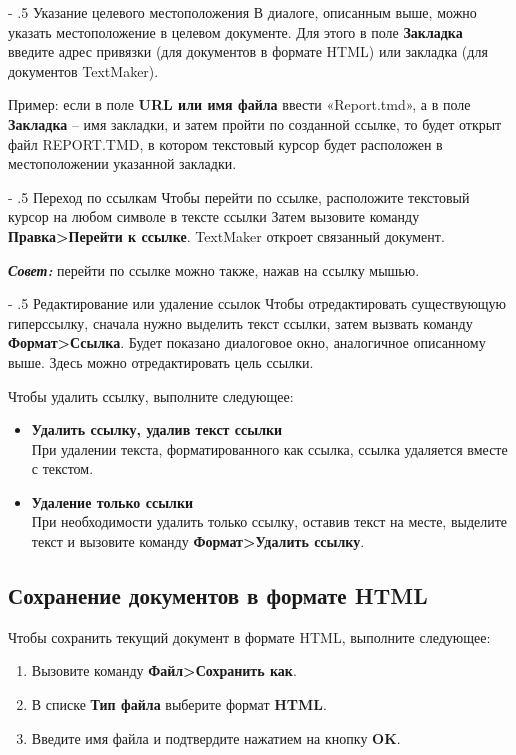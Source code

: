 ﻿\documentclass[a4paper,10pt]{article}
\makeatletter
\renewcommand\paragraph{%
   \@startsection{paragraph}{4}{0mm}%
      {-\baselineskip}%
      {.5\baselineskip}%
      {\normalfont\normalsize\bfseries}}
\makeatother
\begin{document}
\paragraph{Указание целевого местоположения}
В диалоге, описанным выше, можно указать местоположение в целевом документе. Для этого в поле \textbf{Закладка} введите адрес привязки (для документов в формате HTML) или закладка (для документов TextMaker).

Пример: если в поле \textbf{URL или имя файла} ввести «Report.tmd», а в поле \textbf{Закладка} -- имя закладки, и затем пройти по созданной ссылке, то будет открыт файл REPORT.TMD, в котором текстовый курсор будет расположен в местоположении указанной закладки.

\paragraph{Переход по ссылкам}
Чтобы перейти по ссылке, расположите текстовый курсор на любом символе в тексте ссылки Затем вызовите команду \textbf{Правка>Перейти к ссылке}. TextMaker откроет связанный документ.

\begin{mdframed}[backgroundcolor=blue!10]
\textbf{\textit{Совет:}} перейти по ссылке можно также, нажав на ссылку мышью.
\end{mdframed}

\paragraph{Редактирование или удаление ссылок}
Чтобы отредактировать существующую гиперссылку, сначала нужно выделить текст ссылки, затем вызвать команду \textbf{Формат>Ссылка}. Будет показано диалоговое окно, аналогичное описанному выше. Здесь можно отредактировать цель ссылки.

Чтобы удалить ссылку, выполните следующее:
\begin{itemize}
 \item \textbf{Удалить ссылку, удалив текст ссылки}\\
 При удалении текста, форматированного как ссылка, ссылка удаляется вместе с текстом.
 \item \textbf{Удаление только ссылки}\\
 При необходимости удалить только ссылку, оставив текст на месте, выделите текст и вызовите команду \textbf{Формат>Удалить ссылку}.
\end{itemize}

\subsection{Сохранение документов в формате HTML}
Чтобы сохранить текущий документ в формате HTML, выполните следующее:
\begin{enumerate}
 \item Вызовите команду \textbf{Файл>Сохранить как}.
 \item В списке \textbf{Тип файла} выберите формат \textbf{HTML}.
 \item Введите имя файла и подтвердите нажатием на кнопку \textbf{OK}.
\end{enumerate}
\end{document}
